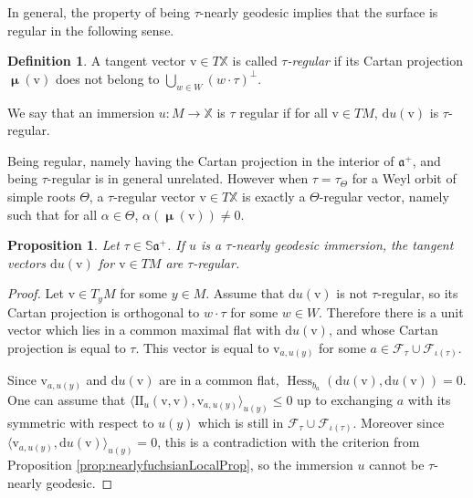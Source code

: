 \documentclass[reqno,10pt]{amsart}
\theoremstyle{plain}
\newtheorem{prop}[thm]{Proposition}
\theoremstyle{definition}
\newtheorem{defn}[thm]{Definition}
\theoremstyle{remark}
\newcommand{\type}{\tau}
\newcommand{\Sph}{\mathbb{S}}
\DeclareMathOperator{\Cartan}{\boldsymbol{\mu}}
\DeclareMathOperator{\Hess}{Hess}
\newcommand{\II}{\mathrm{I\!I}}
\newcommand{\X}{\mathbb{X}}
\begin{document}
In general, the property of being $\type$-nearly geodesic implies that the surface is regular in the following sense.

\begin{defn}
\label{defn:pRegularVector}
A tangent vector $\mathrm{v}\in T\X$ is called \emph{$\type$-regular} if its Cartan projection $\Cartan(\mathrm{v})$ does not belong to $\bigcup_{w\in W}(w\cdot \type)^\perp$.
\end{defn}

We say that an immersion $u:M\to \X$ is $\type$ regular if for all $\mathrm{v}\in TM$, $\mathrm{d}u(\mathrm{v})$ is $\type$-regular.

\medskip

 Being regular, namely having the Cartan projection in the interior of $\mathfrak{a}^+$, and being $\type$-regular is in general unrelated. However when $\type=\type_\Theta$ for a Weyl orbit of simple roots $\Theta$, a $\type$-regular vector $\mathrm{v}\in T\X$ is exactly a $\Theta$-regular vector, namely such that for all $\alpha\in \Theta$, $\alpha\left(\Cartan(\mathrm{v})\right)\neq 0$.

\begin{prop}
\label{prop:pRegularSurface}
Let $\type\in \Sph\mathfrak{a}^+$. If $u$ is a $\type$-nearly geodesic immersion, the tangent vectors $\mathrm{d}u(\mathrm{v})$ for $\mathrm{v}\in TM$ are $\type$-regular.
\end{prop}

\begin{proof}
Let $\mathrm{v}\in T_yM$ for some $y\in M$. Assume that $\mathrm{d}u(\mathrm{v})$ is not $\type$-regular, so its Cartan projection is orthogonal to $w\cdot \type$ for some $w\in W$. Therefore there is a unit vector which lies in a common maximal flat with $\mathrm{d}u(\mathrm{v})$, and whose Cartan projection is equal to $\type$. This vector is equal to $\mathrm{v}_{a,u(y)}$ for some $a\in \mathcal{F}_\type\cup \mathcal{F}_{\iota(\type)}$.

\medskip

Since $\mathrm{v}_{a,u(y)}$ and $\mathrm{d}u(\mathrm{v})$ are in a common flat, $\Hess_{b_a}\left(\mathrm{d}u(\mathrm{v}),\mathrm{d}u(\mathrm{v})\right)=0$. One can assume that $\langle \II_u(\mathrm{v},\mathrm{v}),\mathrm{v}_{a,u(y)}\rangle_{u(y)}\leq 0$ up to exchanging $a$ with its symmetric with respect to $u(y)$ which is still in $\mathcal{F}_\type\cup \mathcal{F}_{\iota(\type)}$. Moreover since $\langle\mathrm{v}_{a,u(y)},\mathrm{d}u(\mathrm{v})\rangle_{u(y)}=0$, this is a contradiction with the criterion from Proposition \ref{prop:nearlyfuchsianLocalProp}, so the immersion $u$ cannot be $\type$-nearly geodesic.\end{proof}
\end{document}

